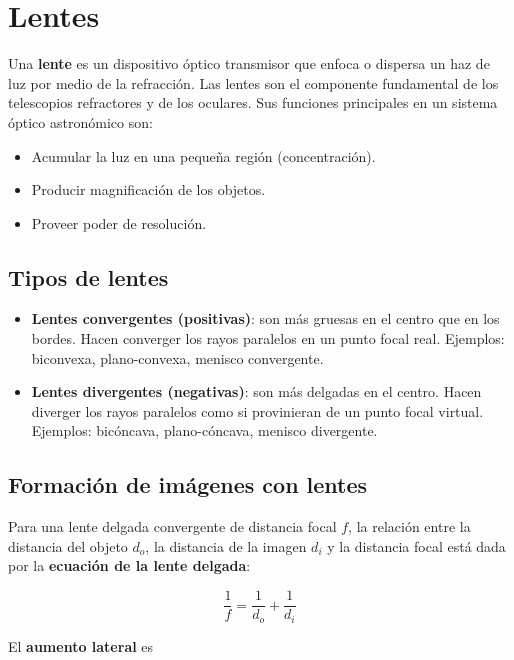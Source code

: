 

\section{Lentes}

Una \textbf{lente} es un dispositivo óptico transmisor que enfoca o dispersa un haz de luz por medio de la refracción. Las lentes son el componente fundamental de los telescopios refractores y de los oculares. Sus funciones principales en un sistema óptico astronómico son:

\begin{itemize}
    \item Acumular la luz en una pequeña región (concentración).
    \item Producir magnificación de los objetos.
    \item Proveer poder de resolución.
\end{itemize}

\subsection{Tipos de lentes}

\begin{itemize}
    \item \textbf{Lentes convergentes (positivas)}: son más gruesas en el centro que en los bordes. Hacen converger los rayos paralelos en un punto focal real. Ejemplos: biconvexa, plano-convexa, menisco convergente.
    \item \textbf{Lentes divergentes (negativas)}: son más delgadas en el centro. Hacen diverger los rayos paralelos como si provinieran de un punto focal virtual. Ejemplos: bicóncava, plano-cóncava, menisco divergente.
\end{itemize}



\subsection{Formación de imágenes con lentes}

Para una lente delgada convergente de distancia focal $f$, la relación entre la distancia del objeto $d_o$, la distancia de la imagen $d_i$ y la distancia focal está dada por la \textbf{ecuación de la lente delgada}:

$$\frac{1}{f} = \frac{1}{d_o} + \frac{1}{d_i}$$

El \textbf{aumento lateral} es

